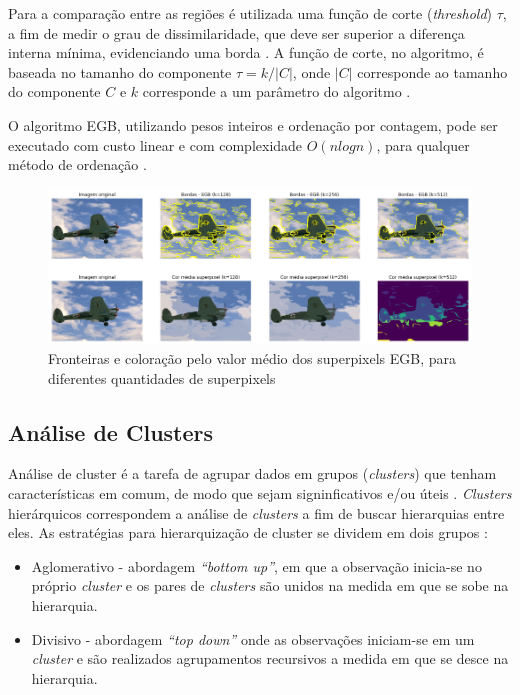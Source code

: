 \begin{document}
Para a comparação entre as regiões é utilizada uma função de corte (\textit{threshold}) $\tau$, a fim de medir o grau de dissimilaridade, que deve ser superior a diferença interna mínima, evidenciando uma borda \cite{FELZENSZWALB}. A função de corte, no algoritmo, é baseada no tamanho do componente $\tau=k/|C|$, onde $|C|$ corresponde ao tamanho do componente $C$ e $k$ corresponde a um parâmetro do algoritmo \cite{FELZENSZWALB}.

O algoritmo EGB, utilizando pesos inteiros e ordenação por contagem, pode ser executado com custo linear e com complexidade $O(nlogn)$, para qualquer método de ordenação \cite{FELZENSZWALB}. 

\begin{figure}[ht]
\centering
\includegraphics[width=1.\textwidth]{felz_segmentation_compare.png}
\caption{Fronteiras e coloração pelo valor médio dos superpixels EGB, para diferentes quantidades de superpixels}
\label{fig:EGB}
\end{figure}


\subsection{Análise de Clusters} \label{ssec:clusters}

Análise de cluster é a tarefa de agrupar dados em grupos (\textit{clusters}) que tenham características em comum, de modo que sejam signinficativos e/ou úteis \cite{CLUSTER_HIER}. \textit{Clusters} hierárquicos correspondem a análise de \textit{clusters} a fim de buscar hierarquias entre eles. As estratégias para hierarquização de cluster se dividem em dois grupos \cite{ROKACH}:

\begin{itemize}
 \item Aglomerativo - abordagem \textit{``bottom up''}, em que a observação inicia-se no próprio \textit{cluster} e os pares de \textit{clusters} são unidos na medida em que se sobe na hierarquia. 
 \item Divisivo - abordagem \textit{``top down''} onde as observações iniciam-se em um \textit{cluster} e são realizados agrupamentos recursivos a medida em que se desce na hierarquia.
\end{itemize}
\end{document}
